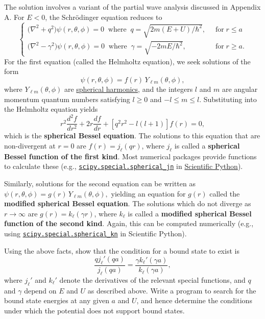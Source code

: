\documentclass[pra,12pt]{revtex4}
\begin{document}
\begin{enumerate}
  The solution involves a variant of the partial wave analysis
  discussed in Appendix A.  For $E < 0$, the Schr\"odinger equation
  reduces to
  \begin{equation}
    \begin{cases}\Big(\nabla^2 + q^2\Big) \psi(r,\theta,\phi) = 0 \;\;\mathrm{where}\;\; q = \sqrt{2m(E+U)/\hbar^2}, \;\;&\mathrm{for} \; r \le a \\ \Big(\nabla^2 - \gamma^2\Big) \psi(r,\theta,\phi) = 0 \;\;\mathrm{where}\;\; \gamma = \sqrt{-2mE/\hbar^2}, \;\;&\mathrm{for} \; r \ge a. \end{cases}
  \end{equation}
  For the first equation (called the Helmholtz equation), we seek
  solutions of the form
  \begin{equation}
    \psi(r,\theta,\phi) = f(r) \, Y_{\ell m}(\theta,\phi),
  \end{equation}
  where $Y_{\ell m}(\theta,\phi)$ are
  \href{https://en.wikipedia.org/wiki/Spherical_harmonics}{spherical
    harmonics}, and the integers $l$ and $m$ are angular momentum
  quantum numbers satisfying $l \ge 0$ and $-l \le m \le l$.
  Substituting into the Helmholtz equation yields
  \begin{equation}
    r^2\frac{d^2f}{dr^2} + 2r \frac{df}{dr}+\left[q^2r^2-l(l+1)\right] f(r) = 0,
  \end{equation}
  which is the \textbf{spherical Bessel equation}.  The solutions to
  this equation that are non-divergent at $r = 0$ are $f(r) =
  j_\ell(qr)$, where $j_\ell$ is called a \textbf{spherical Bessel function
    of the first kind}.  Most numerical packages provide functions to
  calculate these (e.g.,
  \href{https://docs.scipy.org/doc/scipy/reference/generated/scipy.special.spherical_jn.html}{\texttt{scipy.special.spherical\_jn}}
  in \href{https://scipy.org/}{Scientific Python}).

  Similarly, solutions for the second equation can be written as
  $\psi(r,\theta,\phi) = g(r) \, Y_{\ell m}(\theta,\phi),$ yielding an
  equation for $g(r)$ called the \textbf{modified spherical Bessel
    equation}.  The solutions which do not diverge as $r\rightarrow
  \infty$ are $g(r) = k_\ell(\gamma r)$, where $k_\ell$ is called a
  \textbf{modified spherical Bessel function of the second kind}.
  Again, this can be computed numerically (e.g., using
  \href{https://docs.scipy.org/doc/scipy/reference/generated/scipy.special.spherical_kn.html#scipy.special.spherical_kn}{\texttt{scipy.special.spherical\_kn}}
  in Scientific Python).

  Using the above facts, show that the condition for a bound state to
  exist is
  \begin{equation}
    \frac{qj_\ell'(qa)}{j_\ell(qa)} = \frac{\gamma k_\ell'(\gamma a)}{k_\ell(\gamma a)},
  \end{equation}
  where $j_\ell'$ and $k_\ell'$ denote the derivatives of the relevant
  special functions, and $q$ and $\gamma$ depend on $E$ and $U$ as
  described above.  Write a program to search for the bound state
  energies at any given $a$ and $U$, and hence determine the
  conditions under which the potential does not support bound
  states.
\label{ex:boundstate3d}
\end{enumerate}
\end{document}
